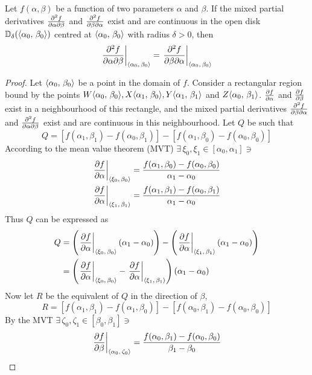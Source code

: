 \begin{lemma}
	Let $f(\alpha,\beta)$ be a function of two parameters $\alpha$ and $\beta$. If the mixed partial derivatives $\pdv{f}{\alpha}{\beta}$
	and $\pdv{f}{\beta}{\alpha}$ exist and are continuous in the open disk $\mathbb{D}_\delta(\langle\alpha_0,\,\beta_0\rangle)$ centred at
	$\langle\alpha_0,\,\beta_0\rangle$ with radius $\delta>0$, then
	$$
		\eval{\pdv{f}{\alpha}{\beta}}_{\point{\alpha_0}{\beta_0}}=\eval{\pdv{f}{\beta}{\alpha}}_{\point{\alpha_0}{\beta_0}}
	$$
	\cite{GARRETT2015377}
	\begin{proof}
		Let $\langle\alpha_0,\,\beta_0\rangle$ be a point in the domain of $f$. Consider a rectangular region bound by the
		points $W\langle\alpha_0,\,\beta_0\rangle,X\langle\alpha_1,\,\beta_0\rangle, Y\langle\alpha_1,\,\beta_1\rangle$  and $Z\langle\alpha_0,\,\beta_1\rangle$. 
		$\pdv{f}{\alpha}$ and $\pdv{f}{\beta}$ exist in a neighbourhood of this rectangle, and the mixed partial derivatives 
		$\pdv{f}{\beta}{\alpha}$ and $\pdv{f}{\alpha}{\beta}$ exist and are continuous in this neighbourhood. Let $Q$ be such that
		$$
		Q=[f(\alpha_1,\beta_1)-f(\alpha_0,\beta_1)]-[f(\alpha_1,\beta_0)-f(\alpha_0,\beta_0)]
		$$
		According to the mean value theorem (MVT) $\exists\,\xi_0,\xi_1\in[\alpha_0,\alpha_1]\ni$
		\begin{align*}
			\eval{\pdv{f}{\alpha}}_{\point{\xi_0}{\beta_0}}&=\frac{f(\alpha_1,\beta_0)-f(\alpha_0,\beta_0)}{\alpha_1-\alpha_0}\\
			\eval{\pdv{f}{\alpha}}_{\point{\xi_1}{\beta_1}}&=\frac{f(\alpha_1,\beta_1)-f(\alpha_0,\beta_1)}{\alpha_1-\alpha_0}
		\end{align*}
		Thus $Q$ can be expressed as
		\begin{align*}
			Q&=\left(\eval{\pdv{f}{\alpha}}_{\point{\xi_0}{\beta_0}}\left(\alpha_1-\alpha_0\right)\right)-\left(\eval{\pdv{f}{\alpha}}_{\point{\xi_1}{\beta_1}}\left(\alpha_1-\alpha_0\right)\right)\\
			&=\left(\eval{\pdv{f}{\alpha}}_{\point{\xi_0}{\beta_0}}-\eval{\pdv{f}{\alpha}}_{\point{\xi_1}{\beta_1}}\right)\left(\alpha_1-\alpha_0\right)
		\end{align*}
		Now let $R$ be the equivalent of $Q$ in the direction of $\beta$,
		$$
			R=[f(\alpha_1,\beta_1)-f(\alpha_1,\beta_0)]-[f(\alpha_0,\beta_1)-f(\alpha_0,\beta_0)]
		$$
		By the MVT $\exists\,\zeta_0,\zeta_1\in[\beta_0,\beta_1]\ni$
		\begin{align*}
			\eval{\pdv{f}{\beta}}_{\point{\alpha_0}{\zeta_0}}&=\frac{f(\alpha_0,\beta_1)-f(\alpha_0,\beta_0)}{\beta_1-\beta_0}\\

\end{align*}
\end{proof}
\end{lemma}

